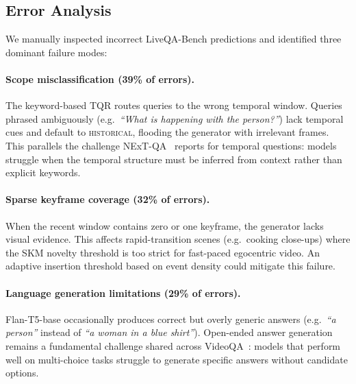 \subsection{Error Analysis}
\label{sec:error_analysis}

We manually inspected incorrect LiveQA-Bench predictions and identified three dominant failure modes:

\paragraph{Scope misclassification (39\% of errors).}
The keyword-based TQR routes queries to the wrong temporal window.
Queries phrased ambiguously (e.g.\ \emph{``What is happening with the person?''}) lack temporal cues and default to \textsc{historical}, flooding the generator with irrelevant frames.
This parallels the challenge NExT-QA~\cite{xiao2021nextqa} reports for temporal questions: models struggle when the temporal structure must be inferred from context rather than explicit keywords.

\paragraph{Sparse keyframe coverage (32\% of errors).}
When the recent window contains zero or one keyframe, the generator lacks visual evidence. This affects rapid-transition scenes (e.g.\ cooking close-ups) where the SKM novelty threshold is too strict for fast-paced egocentric video.
An adaptive insertion threshold based on event density could mitigate this failure.

\paragraph{Language generation limitations (29\% of errors).}
Flan-T5-base occasionally produces correct but overly generic answers (e.g.\ \emph{``a person''} instead of \emph{``a woman in a blue shirt''}).
Open-ended answer generation remains a fundamental challenge shared across VideoQA~\cite{xiao2021nextqa}: models that perform well on multi-choice tasks struggle to generate specific answers without candidate options.


